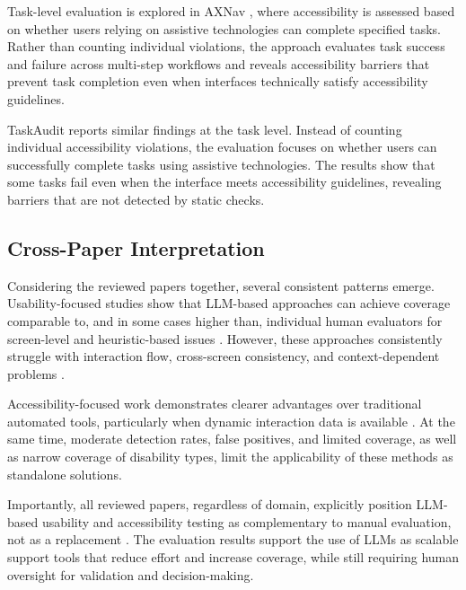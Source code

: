 \documentclass[acmsmall,nonacm]{acmart}
\begin{document}
Task-level evaluation is explored in AXNav \cite{taeb2023axnav}, where accessibility is assessed based on whether users relying on assistive technologies can complete specified tasks. Rather than counting individual violations, the approach evaluates task success and failure across multi-step workflows and reveals accessibility barriers that prevent task completion even when interfaces technically satisfy accessibility guidelines.

TaskAudit \cite{zhong2024taskaudit} reports similar findings at the task level. Instead of counting individual accessibility violations, the evaluation focuses on whether users can successfully complete tasks using assistive technologies. The results show that some tasks fail even when the interface meets accessibility guidelines, revealing barriers that are not detected by static checks.

\subsection{Cross-Paper Interpretation}

Considering the reviewed papers together, several consistent patterns emerge. Usability-focused studies show that LLM-based approaches can achieve coverage comparable to, and in some cases higher than, individual human evaluators for screen-level and heuristic-based issues \cite{xiang2023simuser,zhong2023synthetic_heuristic}. However, these approaches consistently struggle with interaction flow, cross-screen consistency, and context-dependent problems \cite{wang2024aiheureval}.

Accessibility-focused work demonstrates clearer advantages over traditional automated tools, particularly when dynamic interaction data is available \cite{weichbroth2019usability_model,zhong2024screenaudit,aljedaani2024llm_accessibility}. At the same time, moderate detection rates, false positives, and limited coverage, as well as narrow coverage of disability types, limit the applicability of these methods as standalone solutions.

Importantly, all reviewed papers, regardless of domain, explicitly position LLM-based usability and accessibility testing as complementary to manual evaluation, not as a replacement \cite{xiang2023simuser,zhong2023synthetic_heuristic,zhong2024screenaudit,wang2024aiheureval,yang2023uisgpt,aljedaani2024llm_accessibility}. The evaluation results support the use of LLMs as scalable support tools that reduce effort and increase coverage, while still requiring human oversight for validation and decision-making.
\end{document}
